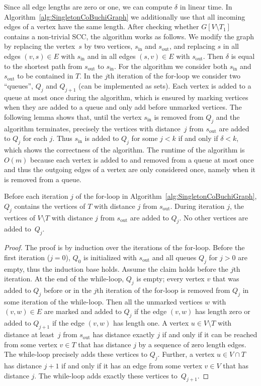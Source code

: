 \documentclass[11pt,letterpaper]{article}
\newcommand{\target}{T\xspace}
\begin{document}
Since all edge lengths are zero or one, we can compute $\delta$ in linear time. 
In Algorithm~\ref{alg:SingletonCoBuchiGraph} we additionally use that all 
incoming edges of a vertex have the same length. After checking whether
$G[V \setminus \target_1]$ contains a non-trivial SCC, the algorithm works as
follows. 
We modify the graph by replacing the vertex~$s$ by two vertices, $s_{\text{in}}$ 
and $s_{\text{out}}$, and replacing $s$ in all edges $(v, s) \in E$ with 
$s_{\text{in}}$ and in all edges $(s, v) \in E$ with $s_{\text{out}}$.
Then $\delta$ is equal to the shortest path from $s_{\text{out}}$ to 
$s_{\text{in}}$. For the algorithm we consider both $s_{\text{in}}$ and 
$s_{\text{out}}$ to be contained in $\target$.
In the $j$th iteration of the for-loop we consider two ``queues'',
$Q_j$ and $Q_{j+1}$ (can be implemented as sets). Each vertex is added to a 
queue at most once during the 
algorithm, which is ensured by marking vertices when they are added to a queue
and only add before unmarked vertices. 
The following lemma shows that, until the vertex $s_{\text{in}}$ is removed from 
$Q_j$ and the algorithm terminates,
precisely the vertices with distance~$j$ from $s_{\text{out}}$ are 
added to $Q_j$ for each $j$. Thus $s_{\text{in}}$ is added to $Q_j$ for some $j < k$ if and 
only if $\delta < k$, which shows the correctness of the algorithm.
The runtime of the algorithm is $O(m)$ because each vertex is added to and 
removed from a queue at most once and thus the outgoing edges of a vertex are
only considered once, namely when it is removed from a queue.
\begin{lemma}
 Before each iteration $j$ of the for-loop in 
 Algorithm~\ref{alg:SingletonCoBuchiGraph}, $Q_j$ contains
 the vertices of $\target$ with distance $j$ from $s_{\text{out}}$.
 During iteration $j$, the vertices of $V \setminus \target$
 with distance $j$ from $s_{\text{out}}$ are added to $Q_j$. 
 No other vertices are added to~$Q_j$.
\end{lemma}
\begin{proof}
The proof is by induction over the iterations of the for-loop.
Before the first iteration ($j=0$), $Q_0$ is initialized with $s_{\text{out}}$
and all queues $Q_j$ for $j > 0$ are empty, 
thus the induction base holds. Assume the claim holds before the $j$th 
iteration.
At the end of the while-loop, $Q_j$ is empty; every vertex $v$ that was added 
to $Q_j$ before or in the $j$th iteration of the for-loop is removed from $Q_j$
in some iteration of the while-loop. Then all the unmarked vertices $w$ with 
$(v, w) \in E$ are marked and added to $Q_j$ if the edge $(v, w)$ has length 
zero or added to $Q_{j+1}$ if the edge $(v, w)$ has length one.
A vertex $u \in V \setminus \target$ with distance
at least~$j$ from $s_{\text{out}}$ has distance exactly $j$ if and only if 
it can be reached from some vertex $v \in \target$ that has distance $j$
by a sequence of zero length edges. The while-loop precisely adds these vertices
to $Q_j$. Further, a vertex $u \in V \cap \target$ has distance $j+1$ if and 
only if it has an edge from some vertex $v \in V$ that has distance $j$.
The while-loop adds exactly these vertices to~$Q_{j+1}$.
\end{proof}
\end{document}
